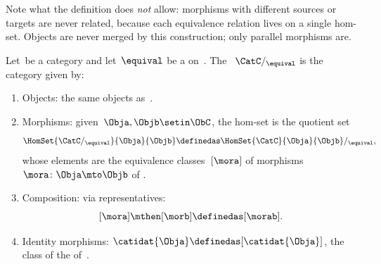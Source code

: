 \begin{remark}
    Note what the definition does \emph{not} allow: morphisms with different sources or targets are never related, because each equivalence relation lives on a single hom-set.
    Objects are never merged by this construction; only parallel morphisms are.
\end{remark}

\begin{ctdefinition}
    \label{def:quotient-category}
    Let~\CatC be a category and let~$\equival$ be a  on~\CatC.
    The ~$\CatC/_{\equival}$ is the category given by:

    \constit

    \begin{enumerate}
        \item Objects: the same objects as~\CatC.
        \item Morphisms: given~$\Obja, \Objb \setin \ObC$, the hom-set is the quotient set
              \begin{equation}
                  \HomSet{\CatC/_{\equival}}{\Obja}{\Objb} \definedas \HomSet{\CatC}{\Obja}{\Objb} /_{\equival},
              \end{equation}
              whose elements are the equivalence classes~$[\mora]$ of morphisms~$\mora \colon \Obja \mto \Objb$ of \CatC.
        \item Composition: via representatives:
              \begin{equation}
                  \label{eq:quotient-cat-composition}
                  [\mora] \mthen [\morb] \definedas [\morab].
              \end{equation}
        \item Identity morphisms: $\catidat{\Obja} \definedas [\catidat{\Obja}]$, the class of the  of~\CatC.
    \end{enumerate}
\end{ctdefinition}

